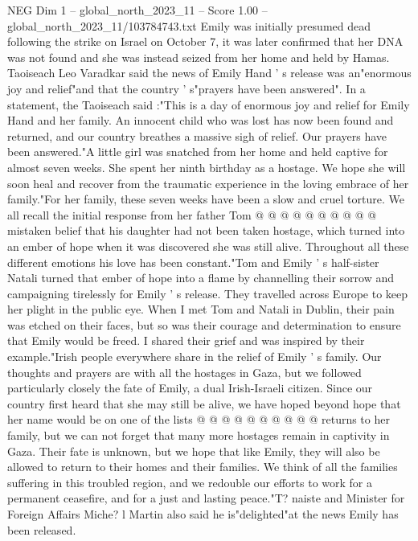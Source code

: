 \begin{textsample}{NEG Dim 1 – global\_north\_2023\_11 – Score 1.00 – global\_north\_2023\_11/103784743.txt}  \label{ex:f1_neg_196}
Emily was initially presumed dead following the strike on Israel on October 7, it was later confirmed that her DNA was not found and she was instead seized from her home and held by Hamas.
Taoiseach Leo Varadkar said the news of Emily Hand ' s release was an"enormous joy and relief"and that the country ' s"prayers have been answered".
In a statement, the Taoiseach said :"This is a day of enormous joy and relief for Emily Hand and her family.
An innocent child who was lost has now been found and returned, and our country breathes a massive sigh of relief.
Our prayers have been answered."A little girl was snatched from her home and held captive for almost seven weeks.
She spent her ninth birthday as a hostage.
We hope she will soon heal and recover from the traumatic experience in the loving embrace of her family."For her family, these seven weeks have been a slow and cruel torture.
We all recall the initial response from her father Tom @ @ @ @ @ @ @ @ @ @ mistaken belief that his daughter had not been taken hostage, which turned into an ember of hope when it was discovered she was still alive.
Throughout all these different emotions his love has been constant."Tom and Emily ' s half-sister Natali turned that ember of hope into a flame by channelling their sorrow and campaigning tirelessly for Emily ' s release.
They travelled across Europe to keep her plight in the public eye.
When I met Tom and Natali in Dublin, their pain was etched on their faces, but so was their courage and determination to ensure that Emily would be freed.
I shared their grief and was inspired by their example."Irish people everywhere share in the relief of Emily ' s family.
Our thoughts and prayers are with all the hostages in Gaza, but we followed particularly closely the fate of Emily, a dual Irish-Israeli citizen.
Since our country first heard that she may still be alive, we have hoped beyond hope that her name would be on one of the lists @ @ @ @ @ @ @ @ @ @ returns to her family, but we can not forget that many more hostages remain in captivity in Gaza.
Their fate is unknown, but we hope that like Emily, they will also be allowed to return to their homes and their families.
We think of all the families suffering in this troubled region, and we redouble our efforts to work for a permanent ceasefire, and for a just and lasting peace."T? naiste and Minister for Foreign Affairs Miche? l Martin also said he is"delighted"at the news Emily has been released.

\end{textsample}
